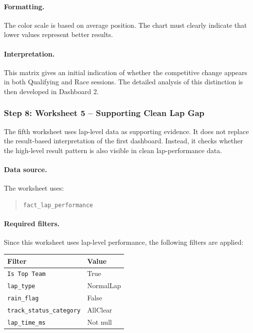 \documentclass[12pt,a4paper]{article}
\begin{document}
	\paragraph{Formatting.}
	The color scale is based on average position.
	The chart must clearly indicate that lower values represent better results.
	
	\paragraph{Interpretation.}
	This matrix gives an initial indication of whether the competitive change appears in both Qualifying and Race sessions.
	The detailed analysis of this distinction is then developed in Dashboard 2.
	
	\subsubsection{Step 8: Worksheet 5 -- Supporting Clean Lap Gap}
	
	The fifth worksheet uses lap-level data as supporting evidence.
	It does not replace the result-based interpretation of the first dashboard.
	Instead, it checks whether the high-level result pattern is also visible in clean lap-performance data.
	
	\paragraph{Data source.}
	The worksheet uses:
	
	\begin{quote}
		\texttt{fact\_lap\_performance}
	\end{quote}
	
	\paragraph{Required filters.}
	Since this worksheet uses lap-level performance, the following filters are applied:
	
	\begin{longtable}{p{5cm} p{8cm}}
		\toprule
		\textbf{Filter} & \textbf{Value} \\
		\midrule
		\texttt{Is Top Team} & True \\
		\texttt{lap\_type} & NormalLap \\
		\texttt{rain\_flag} & False \\
		\texttt{track\_status\_category} & AllClear \\
		\texttt{lap\_time\_ms} & Not null \\
		\bottomrule
	\end{longtable}
	
\end{document}
